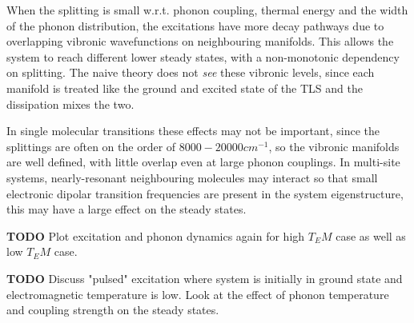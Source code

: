 \documentclass[]{article}
\begin{document}
When the splitting is small w.r.t. phonon coupling, thermal energy and the width of the phonon distribution, the excitations have more decay pathways due to overlapping vibronic wavefunctions on neighbouring manifolds. This allows the system to reach different lower steady states, with a non-monotonic dependency on splitting. The naive theory does not \emph{see} these vibronic levels, since each manifold is treated like the ground and excited state of the TLS and the dissipation mixes the two.

In single molecular transitions these effects may not be important, since the splittings are often on the order of $8000-20000 cm^{-1}$, so the vibronic manifolds are well defined, with little overlap even at large phonon couplings. In multi-site systems, nearly-resonant neighbouring molecules may interact so that small electronic dipolar transition frequencies are present in the system eigenstructure, this may have a large effect on the steady states.

\textbf{TODO}
Plot excitation and phonon dynamics again for high $T_EM$ case as well as low $T_EM$ case.

\textbf{TODO}
Discuss "pulsed" excitation where system is initially in ground state and electromagnetic temperature is low. Look at the effect of phonon temperature and coupling strength on the steady states.
\end{document}
